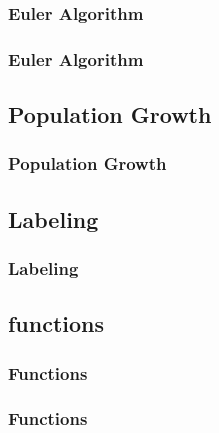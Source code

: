 \documentclass[hyperref={pdfpagelabels=true}]{beamer}
\begin{document}
\begin{frame}
\frametitle{Euler Algorithm}
\scriptsize{
\begin{tcolorbox}[title=Euler error ,width=9.85 cm]

\end{tcolorbox}}
\end{frame}

\begin{frame}
\frametitle{Euler Algorithm}
\scriptsize{
\begin{tcolorbox}[title=Euler Error Test ,width=9.85 cm]

\end{tcolorbox}}
\end{frame}

\subsection{Population Growth}
\begin{frame}
\frametitle{Population Growth}
\tiny{
\begin{tcolorbox}[title=Population Growth ,width=9.85 cm]

\end{tcolorbox}}
\end{frame}

\subsection{Labeling}
\begin{frame}
\frametitle{Labeling}
\scriptsize{
\begin{tcolorbox}[title=  ,width=9.85 cm]

\end{tcolorbox}}
\end{frame}

\subsection{functions}
\begin{frame}
\frametitle{Functions}
\scriptsize{
\begin{tcolorbox}[title= ,width=9.85 cm]

\end{tcolorbox}}
\end{frame}

\begin{frame}
\frametitle{Functions}
\scriptsize{
\begin{tcolorbox}[title=  ,width=9.85 cm]

\end{tcolorbox}}
\end{frame}
\end{document}
